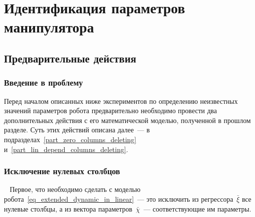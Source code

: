 \section{Идентификация параметров манипулятора}\label{part_identification}
\subsection{Предварительные действия}
\subsubsection{Введение в проблему}
Перед началом описанных ниже экспериментов по определению неизвестных значений параметров робота предварительно необходимо провести два дополнительных действия с его математической моделью, полученной в прошлом разделе.
Суть этих действий описана далее~--- в подразделах~\ref{part_zero_columns_deleting} и~\ref{part_lin_depend_columns_deleting}.


\subsubsection{Исключение нулевых столбцов}~\label{part_zero_columns_deleting}
Первое, что необходимо сделать с моделью робота~\eqref{eq_extended_dynamic_in_linear}~--- это исключить из регрессора~$\bar{\xi}$ все нулевые столбцы, а из вектора параметров~$\bar\chi$~--- соответствующие им параметры.

